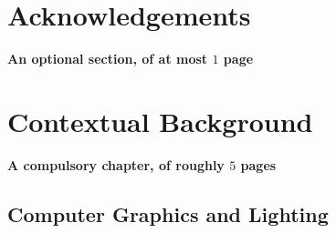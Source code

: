 \documentclass[ %
                    author={Gavin Parker},
                supervisor={Dr. Neill Campbell},
                    degree={MEng},
                     title={Deep Siamese Networks for Illumination Estimation from Stereo Images},
                  subtitle={},
                      type={research},
                      year={2018} ]{dissertation}
\begin{document}

\chapter*{Acknowledgements}

{\bf An optional section, of at most $1$ page}
\vspace{1cm} 

\noindent


%

\mainmatter


\chapter{Contextual Background}
\label{chap:context}

{\bf A compulsory chapter,     of roughly $5$ pages}
\vspace{1cm} 
\section{Computer Graphics and Lighting}
\end{document}
